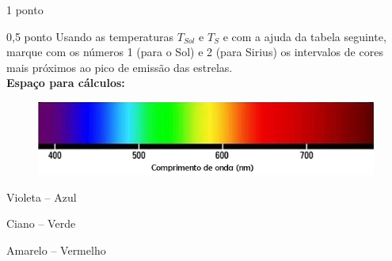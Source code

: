 \documentclass{../lista}
\begin{document}
\begin{questao}{1 ponto}
		\begin{pergunta}{0,5 ponto}
			Usando as temperaturas $T_{Sol}$ e $T_S$ e com a ajuda da tabela seguinte, marque com os números 1 (para o Sol) e 2 (para Sirius) os intervalos de cores mais próximos ao pico de emissão das estrelas. \\

			\textbf{Espaço para cálculos:}
			\espacoCalculo

			\begin{figure}[H]
				\centering
				\includegraphics[scale=0.5]{./img/4.png}
			\end{figure}
			\begin{multicols}{3} \begin{alternativas}
				\item Violeta -- Azul
				\item Ciano -- Verde
				\item Amarelo -- Vermelho
			\end{alternativas} \end{multicols}
		\end{pergunta}
	\end{questao}
\end{document}
